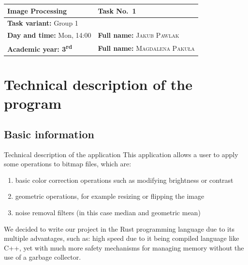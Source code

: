 \documentclass[12pt]{article}
\begin{document}
\pagestyle{fancy}
\fancyfoot[C]{\thepage}

\thispagestyle{empty}
\renewcommand{\arraystretch}{2}
\begin{flushleft}
    \begin{tabularx}{0.95\textwidth}{|X|X|}
        \hline
        \bf \large Image Processing                   & \bf \large Task No.~1                           \\ \hline
        \multicolumn{2}{|l|}{
            \textbf{Task variant:} Group 1
        }                                                                                               \\ \hline
        \textbf{Day and time:} Mon, 14:00             & \textbf{Full name:} \textsc{Jakub Pawlak}       \\
        \textbf{Academic year: 3\textsuperscript{rd}} & \textbf{Full name:} \textsc{Magdalena Paku\l a} \\
        \hline
    \end{tabularx}
\end{flushleft}
\vspace{1em}
\renewcommand{\arraystretch}{1}

\section*{Technical description of the program}
\subsection*{Basic information}

Technical description of the application
This application allows a user to apply some operations to bitmap files, which are:
\begin{enumerate}
    \item basic color correction operations such as modifying brightness or contrast
    \item geometric operations, for example resizing or flipping the image
    \item noise removal filters (in this case median and geometric mean)
\end{enumerate}
We decided to write our project in the Rust programming language due to its multiple advantages, such as:
high speed due to it being compiled language like C++, yet with much more safety mechanisms for managing memory without the use of a garbage collector.
\end{document}
